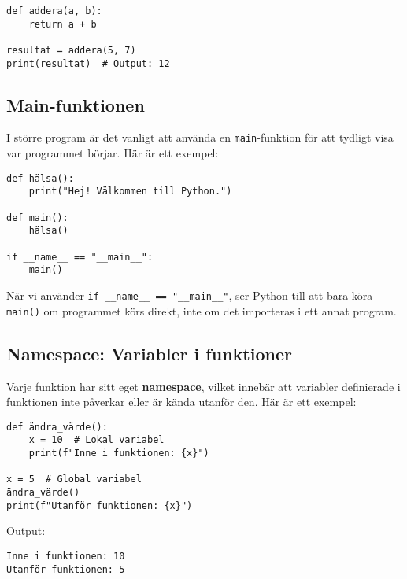\begin{lstlisting}[title=Funktion med returvärde]
def addera(a, b):
    return a + b
    
resultat = addera(5, 7)
print(resultat)  # Output: 12
\end{lstlisting}


\subsection{Main-funktionen}
I större program är det vanligt att använda en \texttt{main}-funktion för att tydligt visa var programmet börjar. Här är ett exempel:

\begin{lstlisting}[title=Ett program med en main-funktion]
def hälsa():
    print("Hej! Välkommen till Python.")
    
def main():
    hälsa()

if __name__ == "__main__":
    main()
\end{lstlisting}

När vi använder \texttt{if \_\_name\_\_ == "\_\_main\_\_"}, ser Python till att bara köra \texttt{main()} om programmet körs direkt, inte om det importeras i ett annat program.


\subsection{Namespace: Variabler i funktioner}
Varje funktion har sitt eget \textbf{namespace}, vilket innebär att variabler definierade i funktionen inte påverkar eller är kända utanför den. Här är ett exempel:

\begin{lstlisting}[title=Namespace och variabler]
def ändra_värde():
    x = 10  # Lokal variabel
    print(f"Inne i funktionen: {x}")
    
x = 5  # Global variabel
ändra_värde()
print(f"Utanför funktionen: {x}")
\end{lstlisting}

Output:
\begin{verbatim}
Inne i funktionen: 10
Utanför funktionen: 5
\end{verbatim}

